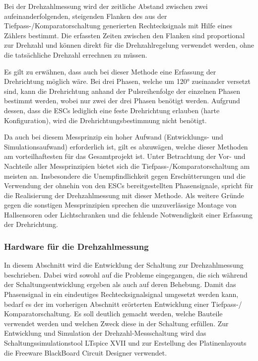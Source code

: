 Bei der Drehzahlmessung wird der zeitliche Abstand zwischen zwei aufeinanderfolgenden, steigenden Flanken des aus der Tiefpass-/Komparatorschaltung generierten Rechtecksignals mit Hilfe eines Zählers bestimmt. Die erfassten Zeiten zwischen den Flanken sind proportional zur Drehzahl und können direkt für die Drehzahlregelung verwendet werden, ohne die tatsächliche Drehzahl errechnen zu müssen.\vspace{11pt}

Es gilt zu erwähnen, dass auch bei dieser Methode eine Erfassung der Drehrichtung möglich wäre. Bei drei Phasen, welche um 120° zueinander versetzt sind, kann die Drehrichtung anhand der Pulsreihenfolge der einzelnen Phasen bestimmt werden, wobei nur zwei der drei Phasen benötigt werden. Aufgrund dessen, dass die ESCs lediglich eine feste Drehrichtung erlauben (harte Konfiguration), wird die Drehrichtungsbestimmung nicht benötigt.\vspace{11pt}

Da auch bei diesem Messprinzip ein hoher Aufwand (Entwicklungs- und Simulationsaufwand) erforderlich ist, gilt es abzuwägen, welche dieser Methoden am vorteilhaftesten für das Gesamtprojekt ist. Unter Betrachtung der Vor- und Nachteile aller Messprinzipien bietet sich die Tiefpass-/Komparatorschaltung am meisten an. Insbesondere die Unempfindlichkeit gegen Erschütterungen und die Verwendung der ohnehin von den ESCs bereitgestellten Phasensignale, spricht für die Realisierung der Drehzahlmessung mit dieser Methode. Als weitere Gründe gegen die sonstigen Messprinzipien sprechen die unzuverlässige Montage von Hallsensoren oder Lichtschranken und die fehlende Notwendigkeit einer Erfassung der Drehrichtung.\vspace{11pt}

\subsubsection{Hardware für die Drehzahlmessung}\label{Sec4Sub5Sub3}

In diesem Abschnitt wird die Entwicklung der Schaltung zur Drehzahlmessung beschrieben. Dabei wird sowohl auf die Probleme eingegangen, die sich während der Schaltungsentwicklung ergeben als auch auf deren Behebung. Damit das Phasensignal in ein eindeutiges Rechtecksignalsignal umgesetzt werden kann, bedarf es der im vorherigen Abschnitt erörterten Entwicklung einer Tiefpass-/ Komparatorschaltung. Es soll deutlich gemacht werden, welche Bauteile verwendet werden und welchen Zweck diese in der Schaltung erfüllen. Zur Entwicklung und Simulation der Drehzahl-Messschaltung wird das Schaltungssimulationstool LTspice XVII und zur Erstellung des Platinenlayouts die Freeware BlackBoard Circuit Designer verwendet.\vspace{11pt}

